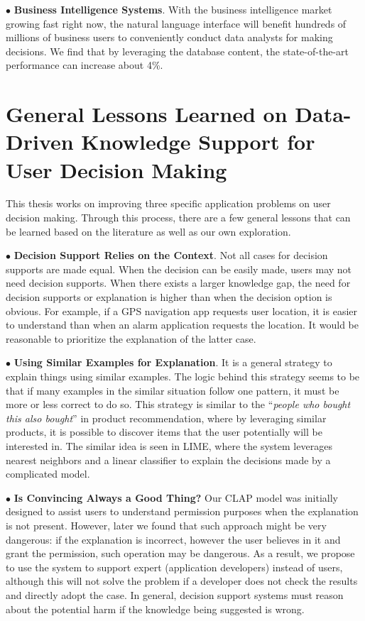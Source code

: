 $\bullet$ \textbf{Business Intelligence Systems}. With the business intelligence market growing fast right now, the natural language interface will benefit hundreds of millions of business users to conveniently conduct data analysts for making decisions. We find that by leveraging the database content, the state-of-the-art performance can increase about 4\%. 

\section{General Lessons Learned on Data-Driven Knowledge Support for User Decision Making}

This thesis works on improving three specific application problems on user decision making. Through this process, there are a few general lessons that can be learned based on the literature as well as our own exploration. 

$\bullet$ \textbf{Decision Support Relies on the Context}. Not all cases for decision supports are made equal. When the decision can be easily made, users may not need decision supports. When there exists a larger knowledge gap, the need for decision supports or explanation is higher than when the decision option is obvious. For example, if a GPS navigation app requests user location, it is easier to understand than when an alarm application requests the location. It would be reasonable to prioritize the explanation of the latter case. 

$\bullet$ \textbf{Using Similar Examples for Explanation}. It is a general strategy to explain things using similar examples. The logic behind this strategy seems to be that if many examples in the similar situation follow one pattern, it must be more or less correct to do so. This strategy is similar to the ``\emph{people who bought this also bought}'' in product recommendation, where by leveraging similar products, it is possible to discover items that the user potentially will be interested in. The similar idea is seen in LIME, where the system leverages nearest neighbors and a linear classifier to explain the decisions made by a complicated model. 

$\bullet$ \textbf{Is Convincing Always a Good Thing?} Our CLAP model was initially designed to assist users to understand permission purposes when the explanation is not present. However, later we found that such approach might be very dangerous: if the explanation is incorrect, however the user believes in it and grant the permission, such operation may be dangerous. As a result, we propose to use the system to support expert (application developers) instead of users, although this will not solve the problem if a developer does not check the results and directly adopt the case. In general, decision support systems must reason about the potential harm if the knowledge being suggested is wrong. 

